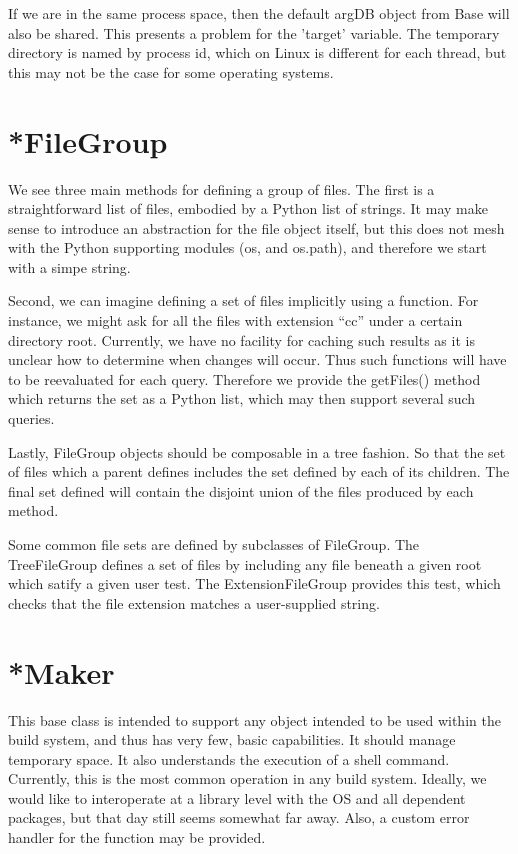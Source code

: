 If we are in the same process space, then the default argDB object from Base will also be shared. This presents a
problem for the 'target' variable. The temporary directory is named by process id, which on Linux is different for each
thread, but this may not be the case for some operating systems.

\section{*FileGroup}

We see three main methods for defining a group of files. The first is a straightforward list of files, embodied by a
Python list of strings. It may make sense to introduce an abstraction for the file object itself, but this does not mesh
with the Python supporting modules (os, and os.path), and therefore we start with a simpe string.

Second, we can imagine defining a set of files implicitly using a function. For instance, we might ask for all the files
with extension ``cc'' under a certain directory root. Currently, we have no facility for caching such results as it is
unclear how to determine when changes will occur. Thus such functions will have to be reevaluated for each
query. Therefore we provide the getFiles() method which returns the set as a Python list, which may then support several
such queries.

Lastly, FileGroup objects should be composable in a tree fashion. So that the set of files which a parent defines
includes the set defined by each of its children. The final set defined will contain the disjoint union of the files
produced by each method.

Some common file sets are defined by subclasses of FileGroup. The TreeFileGroup defines a set of files by including any
file beneath a given root which satify a given user test. The ExtensionFileGroup provides this test, which checks that
the file extension matches a user-supplied string.

\section{*Maker}

This base class is intended to support any object intended to be used within the build system, and thus has very few,
basic capabilities. It should manage temporary space. It also understands the execution of a shell command. Currently,
this is the most common operation in any build system. Ideally, we would like to interoperate at a library level with
the OS and all dependent packages, but that day still seems somewhat far away. Also, a custom error handler for the
function may be provided.

